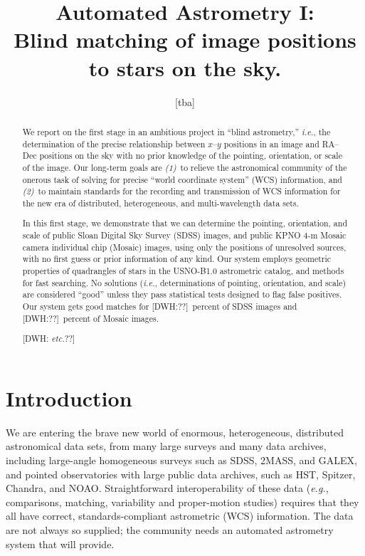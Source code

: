 \documentclass[12pt,preprint]{aastex}
\newcommand{\latin}[1]{\textit{#1}}
\newcommand{\ie}{\latin{i.e.}}
\newcommand{\eg}{\latin{e.g.}}
\newcommand{\etc}{\latin{etc.}}
\begin{document}
\title{
  Automated Astrometry I:\\
  Blind matching of image positions to stars on the sky.
}
\author{
  [tba]
}

\begin{abstract}
We report on the first stage in an ambitious project in ``blind
astrometry,'' \ie, the determination of the precise relationship
between $x$--$y$ positions in an image and RA--Dec positions on the
sky with no prior knowledge of the pointing, orientation, or scale of
the image.  Our long-term goals are \textsl{(1)}~to relieve the
astronomical community of the onerous task of solving for precise
``world coordinate system'' (WCS) information, and \textsl{(2)}~to
maintain standards for the recording and transmission of WCS
information for the new era of distributed, heterogeneous, and
multi-wavelength data sets.

In this first stage, we demonstrate that we can determine the
pointing, orientation, and scale of public Sloan Digital Sky Survey
(SDSS) images, and public KPNO 4-m Mosaic camera individual chip
(Mosaic) images, using only the positions of unresolved sources, with
no first guess or prior information of any kind.  Our system employs
geometric properties of quadrangles of stars in the USNO-B1.0
astrometric catalog, and methods for fast searching.  No solutions
(\ie, determinations of pointing, orientation, and scale) are
considered ``good'' unless they pass statistical tests designed to
flag false positives.  Our system gets good matches for
[DWH:??]~percent of SDSS images and [DWH:??]~percent of Mosaic images.

[DWH: \etc??]
\end{abstract}


\section{Introduction}

We are entering the brave new world of enormous, heterogeneous,
distributed astronomical data sets, from many large surveys and many
data archives, including large-angle homogeneous surveys such as SDSS,
2MASS, and GALEX, and pointed observatories with large public data
archives, such as HST, Spitzer, Chandra, and NOAO.  Straightforward
interoperability of these data (\eg, comparisons, matching,
variability and proper-motion studies) requires that they all have
correct, standards-compliant astrometric (WCS) information.  The data
are not always so supplied; the community needs an automated
astrometry system that will provide.
\end{document}
